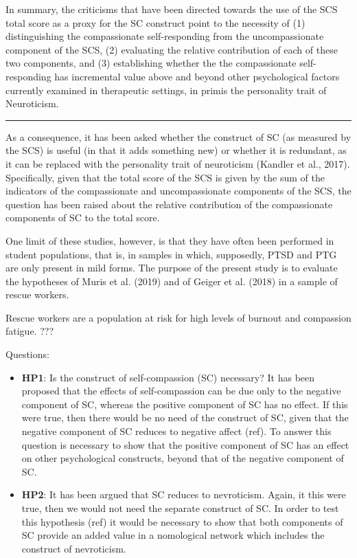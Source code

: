 \documentclass[
  english,
  man,floatsintext]{apa7}
\begin{document}
In summary, the criticisms that have been directed towards the use of the SCS total score as a proxy for the SC construct point to the necessity of (1) distinguishing the compassionate self-responding from the uncompassionate component of the SCS, (2) evaluating the relative contribution of each of these two components, and (3) establishing whether the the compassionate self-responding has incremental value above and beyond other psychological factors currently examined in therapeutic settings, in primis the personality trait of Neuroticism.

\begin{center}\rule{0.5\linewidth}{0.5pt}\end{center}

As a consequence, it has been asked whether the construct of SC (as measured by the SCS) is useful (in that it adds something new) or whether it is redundant, as it can be replaced with the personality trait of neuroticism (Kandler et al., 2017).
Specifically, given that the total score of the SCS is given by the sum of the indicators of the compassionate and uncompassionate components of the SCS, the question has been raised about the relative contribution of the compassionate components of SC to the total score.

One limit of these studies, however, is that they have often been performed in student populations, that is, in samples in which, supposedly, PTSD and PTG are only present in mild forms.
The purpose of the present study is to evaluate the hypotheses of Muris et al. (2019) and of Geiger et al. (2018) in a sample of rescue workers.

Rescue workers are a population at risk for high levels of burnout and compassion fatigue.
???

Questions:

\begin{itemize}
\item
  \textbf{HP1}: Is the construct of self-compassion (SC) necessary?
  It has been proposed that the effects of self-compassion can be due only to the negative component of SC, whereas the positive component of SC has no effect.
  If this were true, then there would be no need of the construct of SC, given that the negative component of SC reduces to negative affect (ref).
  To answer this question is necessary to show that the positive component of SC has an effect on other psychological constructs, beyond that of the negative component of SC.
\item
  \textbf{HP2}: It has been argued that SC reduces to nevroticism.
  Again, it this were true, then we would not need the separate construct of SC.
  In order to test this hypothesis (ref) it would be necessary to show that both components of SC provide an added value in a nomological network which includes the construct of nevroticism.
\end{itemize}
\end{document}
